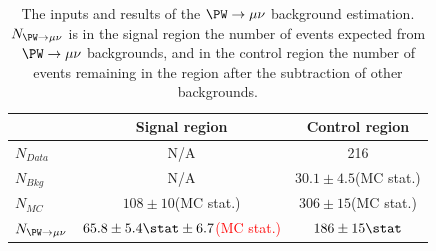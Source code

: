 \begin{table}
  \caption{The inputs and results of the $\PW\rightarrow \mu\nu$ background estimation. $N_{\PW\rightarrow \mu\nu}$ is in the signal region the number of events expected from $\PW\rightarrow \mu\nu$ backgrounds, and in the control region the number of events remaining in the region after the subtraction of other backgrounds.}
  \label{tab:promptwmunu}
  \begin{tabular}{lcc}
    \hline
    \hline
    & Signal region & Control region \\
    \hline
    \hline
    $N_{Data}$ & N/A & 216\\
    $N_{Bkg}$ & N/A & $30.1\pm 4.5$(\ac{MC} stat.) \\
    $N_{MC}$& $108\pm 10$(\ac{MC} stat.) & $306\pm 15$(\ac{MC} stat.) \\
    \hline
    $N_{\PW\rightarrow \mu\nu}$& \textcolor{red}{$65.8\pm 5.4\stat\pm 6.7$(MC stat.)} & $186\pm 15\stat$ \\
    \hline
    \hline
  \end{tabular}
\end{table}

